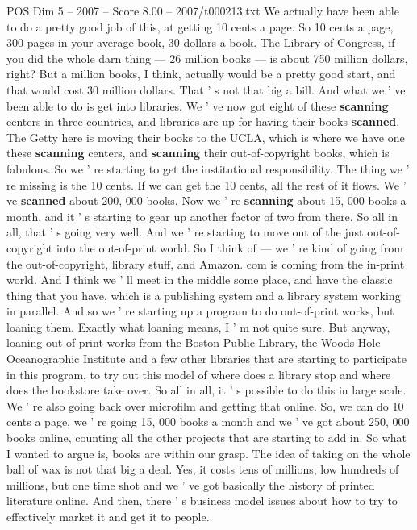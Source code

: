 \begin{textsample}{POS Dim 5 – 2007 – Score 8.00 – 2007/t000213.txt}
We actually have been able to do a pretty good job of this, at getting 10 cents a page.
So 10 cents a page, 300 pages in your average book, 30 dollars a book.
The Library of Congress, if you did the whole darn thing — 26 million books — is about 750 million dollars, right?
But a million books, I think, actually would be a pretty good start, and that would cost 30 million dollars.
That ' s not that big a bill.
And what we ' ve been able to do is get into libraries.
We ' ve now got eight of these \textbf{scanning} centers in three countries, and libraries are up for having their books \textbf{scanned}.
The Getty here is moving their books to the UCLA, which is where we have one these \textbf{scanning} centers, and \textbf{scanning} their out-of-copyright books, which is fabulous.
So we ' re starting to get the institutional responsibility.
The thing we ' re missing is the 10 cents.
If we can get the 10 cents, all the rest of it flows.
We ' ve \textbf{scanned} about 200, 000 books.
Now we ' re \textbf{scanning} about 15, 000 books a month, and it ' s starting to gear up another factor of two from there.
So all in all, that ' s going very well.
And we ' re starting to move out of the just out-of-copyright into the out-of-print world.
So I think of — we ' re kind of going from the out-of-copyright, library stuff, and Amazon. com is coming from the in-print world.
And I think we ' ll meet in the middle some place, and have the classic thing that you have, which is a publishing system and a library system working in parallel.
And so we ' re starting up a program to do out-of-print works, but loaning them.
Exactly what loaning means, I ' m not quite sure.
But anyway, loaning out-of-print works from the Boston Public Library, the Woods Hole Oceanographic Institute and a few other libraries that are starting to participate in this program, to try out this model of where does a library stop and where does the bookstore take over.
So all in all, it ' s possible to do this in large scale.
We ' re also going back over microfilm and getting that online.
So, we can do 10 cents a page, we ' re going 15, 000 books a month and we ' ve got about 250, 000 books online, counting all the other projects that are starting to add in.
So what I wanted to argue is, books are within our grasp.
The idea of taking on the whole ball of wax is not that big a deal.
Yes, it costs tens of millions, low hundreds of millions, but one time shot and we ' ve got basically the history of printed literature online.
And then, there ' s business model issues about how to try to effectively market it and get it to people.

\end{textsample}

